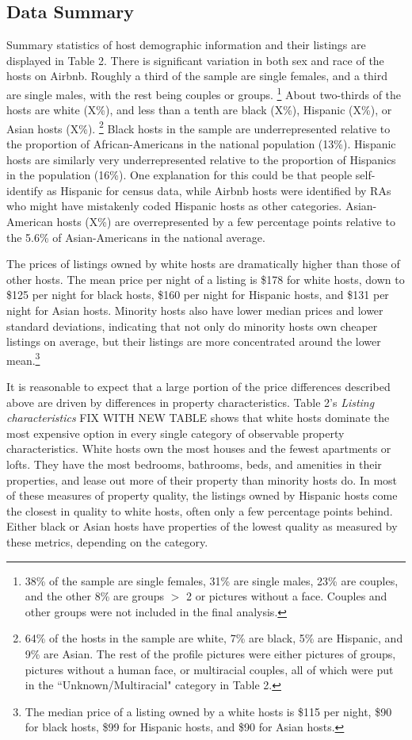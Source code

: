 \subsection{Data Summary}

Summary statistics of host demographic information and their listings are displayed in Table 2. There is significant variation in both sex and race of the hosts on Airbnb. Roughly a third of the sample are single females, and a third are single males, with the rest being couples or groups.%
	\footnote{38\% of the sample are single females, 31\% are single males, 23\% are couples, and the other 8\% are groups $>$ 2 or pictures without a face. Couples and other groups were not included in the final analysis.} 
About two-thirds of the hosts are white (X\%), and less than a tenth are black (X\%), Hispanic (X\%), or Asian hosts (X\%).%
	\footnote{64\% of the hosts in the sample are white, 7\% are black, 5\% are Hispanic, and 9\% are Asian. The rest of the profile pictures were either pictures of groups, pictures without a human face, or multiracial couples, all of which were put in the ``Unknown/Multiracial" category in Table 2.} 
Black hosts in the sample are underrepresented relative to the proportion of African-Americans in the national population (13\%). Hispanic hosts are similarly very underrepresented relative to the proportion of Hispanics in the population (16\%). One explanation for this could be that people self-identify as Hispanic for census data, while Airbnb hosts were identified by RAs who might have mistakenly coded Hispanic hosts as other categories. Asian-American hosts (X\%) are overrepresented by a few percentage points relative to the 5.6\% of Asian-Americans in the national average.\cite{census} 

The prices of listings owned by white hosts are dramatically higher than those of other hosts. The mean price per night of a listing is \$178 for white hosts, down to \$125 per night for black hosts, \$160 per night for Hispanic hosts, and \$131 per night for Asian hosts. Minority hosts also have lower median prices and lower standard deviations, indicating that not only do minority hosts own cheaper listings on average, but their listings are more concentrated around the lower mean.\footnote{The median price of a listing owned by a white hosts is \$115 per night, \$90 for black hosts, \$99 for Hispanic hosts, and \$90 for Asian hosts.} 

It is reasonable to expect that a large portion of the price differences described above are driven by differences in property characteristics. Table 2's \textit{Listing characteristics} FIX WITH NEW TABLE shows that white hosts dominate the most expensive option in every single category of observable property characteristics. White hosts own the most houses and the fewest apartments or lofts. They have the most bedrooms, bathrooms, beds, and amenities in their properties, and lease out more of their property than minority hosts do. In most of these measures of property quality, the listings owned by Hispanic hosts come the closest in quality to white hosts, often only a few percentage points behind. Either black or Asian hosts have properties of the lowest quality as measured by these metrics, depending on the category. 

